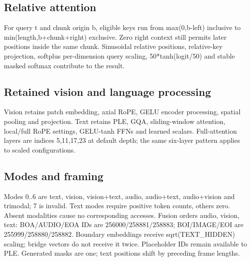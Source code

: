 \documentclass[11pt,a4paper]{article}
\begin{document}
\subsection{Relative attention}

For query t and chunk origin b,\allowbreak{} eligible keys run from max(\allowbreak{}0,\allowbreak{}b-left)\allowbreak{} inclusive to min(\allowbreak{}length,\allowbreak{}b+\allowbreak{}chunk+\allowbreak{}right)\allowbreak{} exclusive. Zero right context still permits later positions inside the same chunk. Sinusoidal relative positions,\allowbreak{} relative-key projection,\allowbreak{} softplus per-dimension query scaling,\allowbreak{} 50*\allowbreak{}tanh(\allowbreak{}logit/\allowbreak{}50)\allowbreak{} and stable masked softmax contribute to the result.

\subsection{Retained vision and language processing}

Vision retains patch embedding,\allowbreak{} axial RoPE,\allowbreak{} GELU encoder processing,\allowbreak{} spatial pooling and projection. Text retains PLE,\allowbreak{} GQA,\allowbreak{} sliding-window attention,\allowbreak{} local/\allowbreak{}full RoPE settings,\allowbreak{} GELU-tanh FFNs and learned scalars. Full-attention layers are indices 5,\allowbreak{}11,\allowbreak{}17,\allowbreak{}23 at default depth; the same six-layer pattern applies to scaled configurations.

\subsection{Modes and framing}

Modes 0..6 are text,\allowbreak{} vision,\allowbreak{} vision+\allowbreak{}text,\allowbreak{} audio,\allowbreak{} audio+\allowbreak{}text,\allowbreak{} audio+\allowbreak{}vision and trimodal; 7 is invalid. Text modes require positive token counts,\allowbreak{} others zero. Absent modalities cause no corresponding accesses. Fusion orders audio,\allowbreak{} vision,\allowbreak{} text: BOA/\allowbreak{}AUDIO/\allowbreak{}EOA IDs are 256000/\allowbreak{}258881/\allowbreak{}258883; BOI/\allowbreak{}IMAGE/\allowbreak{}EOI are 255999/\allowbreak{}258880/\allowbreak{}258882. Boundary embeddings receive sqrt(\allowbreak{}TEXT\_\allowbreak{}HIDDEN)\allowbreak{} scaling; bridge vectors do not receive it twice. Placeholder IDs remain available to PLE. Generated masks are one; text positions shift by preceding frame lengths.
\end{document}
